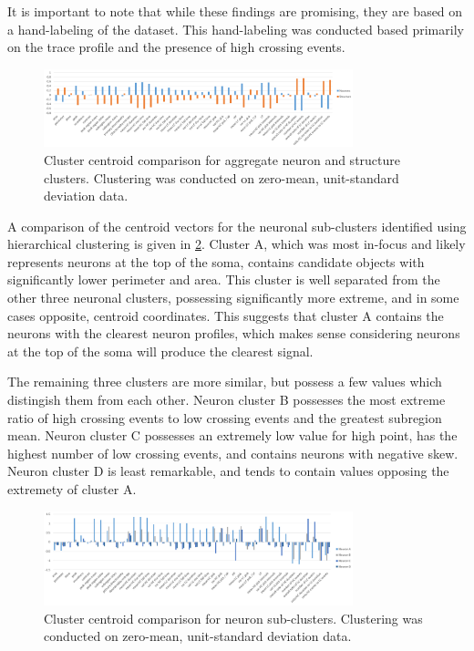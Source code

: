 \documentclass[10pt]{article}
\begin{document}
It is important to note that while these findings are promising, they are based on a hand-labeling of the dataset. This hand-labeling was conducted based primarily on the trace profile and the presence of high crossing events.

\begin{figure}[h]
    \centering
    \includegraphics[width=0.8\textwidth]{figs/centroid_binary_barplot.png}
    \caption{\footnotesize Cluster centroid comparison for aggregate neuron and structure clusters. Clustering was conducted on zero-mean, unit-standard deviation data.}
    \label{fig:binaryclustercompare}
\end{figure}

A comparison of the centroid vectors for the neuronal sub-clusters identified using hierarchical clustering is given in \cref{fig:neuronclustercompare}.
Cluster A, which was most in-focus and likely represents neurons at the top of the soma, contains candidate objects with significantly lower perimeter and area. This cluster is well separated from the other three neuronal clusters, possessing significantly more extreme, and in some cases opposite, centroid coordinates. This suggests that cluster A contains the neurons with the clearest neuron profiles, which makes sense considering neurons at the top of the soma will produce the clearest signal.

The remaining three clusters are more similar, but possess a few values which distingish them from each other. Neuron cluster B possesses the most extreme ratio of high crossing events to low crossing events and the greatest subregion mean. Neuron cluster C possesses an extremely low value for high point, has the highest number of low crossing events, and contains neurons with negative skew. Neuron cluster D is least remarkable, and tends to contain values opposing the extremety of cluster A.

\begin{figure}[h]
    \centering
    \includegraphics[width=0.8\textwidth]{figs/centroid_neuron_barplot.png}
    \caption{\footnotesize Cluster centroid comparison for neuron sub-clusters. Clustering was conducted on zero-mean, unit-standard deviation data.}
    \label{fig:neuronclustercompare}
\end{figure}
\end{document}
